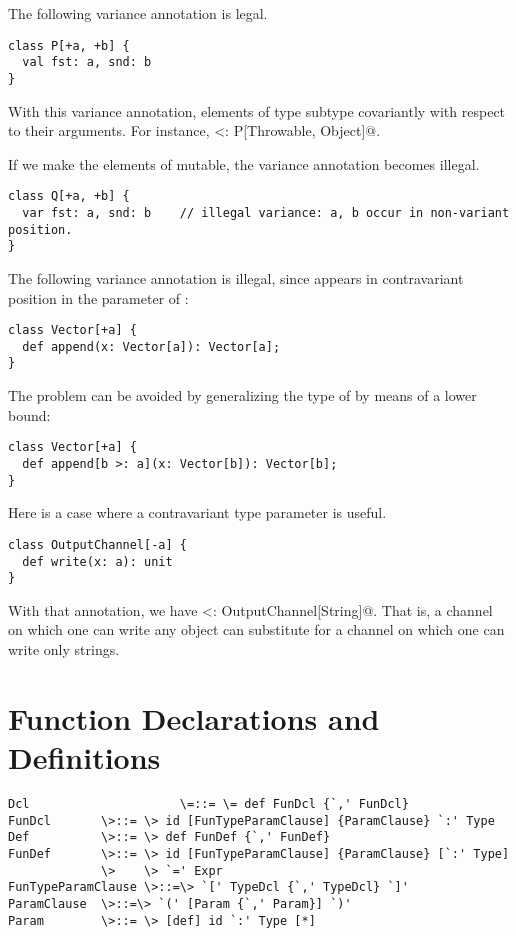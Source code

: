 \documentclass[11pt]{report}
\begin{document}
\example The following variance annotation is legal. 
\begin{verbatim}
class P[+a, +b] { 
  val fst: a, snd: b 
}
\end{verbatim}
With this variance annotation, elements
of type \verb@P@ subtype covariantly with respect to their arguments. 
For instance,  <: P[Throwable, Object]@.

If we make the elements of \verb@P@ mutable, the variance annotation becomes illegal. 
\begin{verbatim}
class Q[+a, +b] { 
  var fst: a, snd: b    // illegal variance: a, b occur in non-variant position.
}
\end{verbatim}

\example The following variance annotation is illegal, since \verb@a@ appears
in contravariant position in the parameter of \verb@append@:

\begin{verbatim}
class Vector[+a] {
  def append(x: Vector[a]): Vector[a];
}
\end{verbatim} 
The problem can be avoided by generalizing the type of \verb@append@
by means of a lower bound:

\begin{verbatim}
class Vector[+a] {
  def append[b >: a](x: Vector[b]): Vector[b];
}
\end{verbatim}

\example Here is a case where a contravariant type parameter is useful.

\begin{verbatim}
class OutputChannel[-a] {
  def write(x: a): unit
}
\end{verbatim}
With that annotation, we have
\verb@OutputChannel[Object] <: OutputChannel[String]@.  That is, a
channel on which one can write any object can substitute for a channel
on which one can write only strings.

\section{Function Declarations and Definitions}
\label{sec:defdef}
\label{sec:funsigs}

\syntax\begin{verbatim} 
Dcl                     \=::= \= def FunDcl {`,' FunDcl} 
FunDcl       \>::= \> id [FunTypeParamClause] {ParamClause} `:' Type 
Def          \>::= \> def FunDef {`,' FunDef} 
FunDef       \>::= \> id [FunTypeParamClause] {ParamClause} [`:' Type] 
             \>    \> `=' Expr 
FunTypeParamClause \>::=\> `[' TypeDcl {`,' TypeDcl} `]' 
ParamClause  \>::=\> `(' [Param {`,' Param}] `)' 
Param        \>::= \> [def] id `:' Type [*]
\end{verbatim}
\end{document}
